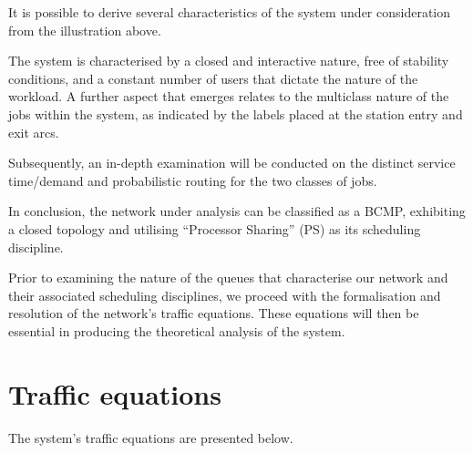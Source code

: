It is possible to derive several characteristics of the system under consideration from the illustration above.

The system is characterised by a closed and interactive nature, free of stability conditions, and a constant number of users that dictate the nature of the workload.
A further aspect that emerges relates to the multiclass nature of the jobs within the system, as indicated by the labels placed at the station entry and exit arcs.

Subsequently, an in-depth examination will be conducted on the distinct service time/demand and probabilistic routing for the two classes of jobs.

In conclusion, the network under analysis can be classified as a BCMP, exhibiting a closed topology and utilising ``Processor Sharing'' (PS) as its scheduling discipline.

Prior to examining the nature of the queues that characterise our network and their associated scheduling disciplines, we proceed with the formalisation and resolution of the network's traffic equations.
These equations will then be essential in producing the theoretical analysis of the system.

\section{Traffic equations}

The system's traffic equations are presented below.

